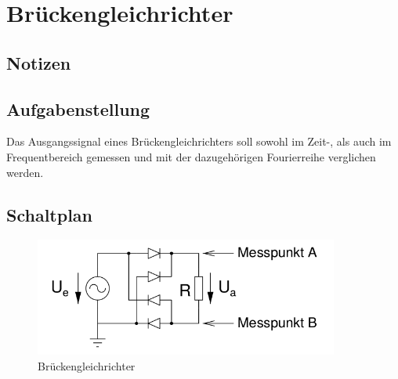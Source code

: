 \documentclass[12pt,a4paper,titlepage]{article}
\begin{document}
\section{Brückengleichrichter}

\subsection*{Notizen}
%
%
%


\subsection*{Aufgabenstellung}
Das Ausgangssignal eines Brückengleichrichters soll sowohl im Zeit-, als auch im Frequentbereich gemessen und mit der dazugehörigen Fourierreihe verglichen werden.

\subsection*{Schaltplan}
\begin{figure}[H]
  \centering
  \includegraphics[width=100mm]{bg_schaltung.png}
  \caption{Brückengleichrichter}
  \label{figure41}
\end{figure}
\end{document}
